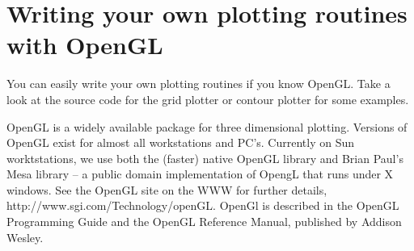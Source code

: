 \documentclass{article}
\newcommand{\Index}[1]{#1\index{#1}}
\begin{document}
\section{Writing your own plotting routines with \Index{OpenGL}}

You can easily write your own plotting routines if you know OpenGL.
Take a look at the source code for the grid plotter or contour
plotter for some examples.

OpenGL is a widely available package for three dimensional plotting.
Versions of OpenGL exist for almost all workstations and PC's.
Currently on Sun worktstations, we use both the (faster) native OpenGL
library and Brian Paul's Mesa library --
a public domain implementation of OpengL that runs under X windows.
See the OpenGL site on the WWW for further details, 
{\ff http://www.sgi.com/Technology/openGL}. 
OpenGl is described
in  the {\ff OpenGL Programming Guide} and the {\ff OpenGL Reference
Manual}, published by Addison Wesley.
\end{document}
